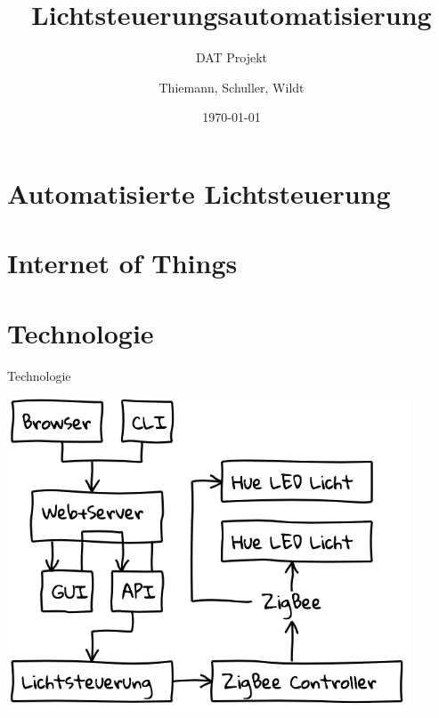 \documentclass[10pt, compress]{beamer}
\title{Lichtsteuerungsautomatisierung}
\subtitle{DAT Projekt}
\date{\today}
\author{Thiemann, Schuller, Wildt}
\institute{Hochschule Rosenheim}
\begin{document}
\maketitle

\section{Automatisierte Lichtsteuerung}


\section{Internet of Things}

\section{Technologie}

\begin{frame}{Technologie}
  \begin{center}
    \includegraphics[width=0.9\textwidth]{images/grobarchitektur.png}
  \end{center}
\end{frame}
\end{document}
